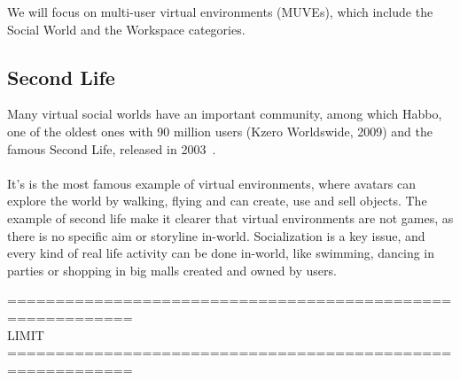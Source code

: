 We will focus on multi-user virtual environments (MUVEs), which include the Social World and the Workspace categories. 


\subsection{Second Life}

Many virtual social worlds have an important community, among which Habbo, one of the oldest ones with 90 million users (Kzero Worldswide, 2009) and the famous Second Life, released in 2003~\cite{wang2009extending}. 
\paragraph{}
It's is the most famous example of virtual environments, where avatars can explore the world by walking, flying and can create, use and sell objects. The example of second life make it clearer that virtual environments are not games, as there is no specific aim or storyline in-world. Socialization is a key issue, and every kind of real life activity can be done in-world, like swimming, dancing in parties or shopping in big malls created and owned by users.
  
===========================================================\\
LIMIT\\
===========================================================
